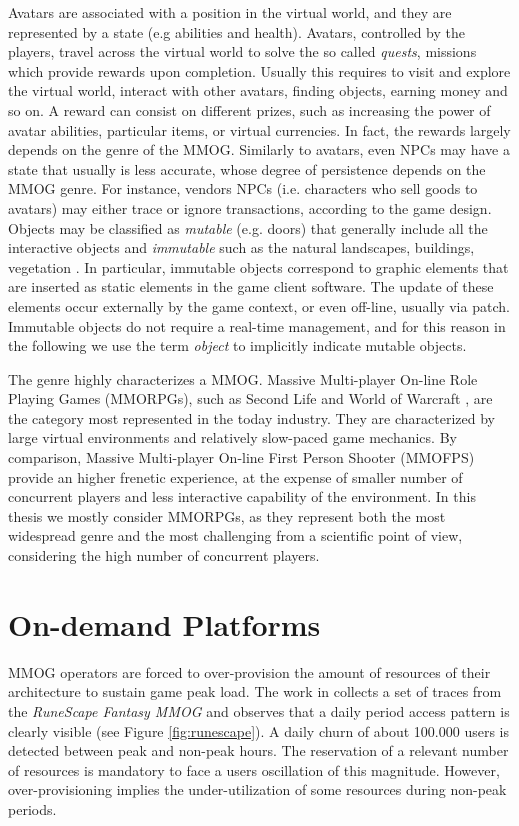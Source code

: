 \documentclass[final,10pt,a5paper]{phdimt}
\theoremstyle{definition}
\begin{document}
Avatars are associated with a position in the virtual world, and they are represented by a state (e.g  abilities and health).
Avatars, controlled by the players, travel across the virtual world to solve the so called \textit{quests}, missions which provide rewards upon completion.
Usually this requires to visit and explore the virtual world, interact with other avatars, finding objects, earning money and so on. 
A reward can consist on different prizes, such as increasing the power of avatar abilities, particular items, or virtual currencies. In fact, the rewards largely depends on the genre of the MMOG. 
Similarly to avatars, even NPCs may have a state that usually is less accurate, whose degree of persistence depends on the MMOG genre. 
For instance, vendors NPCs (i.e. characters who sell goods to avatars) may either trace or ignore transactions, according to the game design.
Objects may be classified as \textit{mutable} (e.g. doors) that generally include all the interactive objects and \textit{immutable} such as the natural landscapes, buildings, vegetation \cite{Bharambea}.
In particular, immutable objects correspond to graphic elements that are inserted as static elements in the game client software. The update of these elements occur externally by the game context, or even off-line, usually via patch.
Immutable objects do not require a real-time management, and for this reason in the following we use the term \textit{object} to implicitly indicate mutable objects.


The genre highly characterizes a MMOG.
Massive Multi-player On-line Role Playing Games (MMORPGs), such as Second Life \cite{sl-site} and World of Warcraft \cite{wow-site}, are the category most represented in the today industry. They are characterized by large virtual environments and relatively slow-paced game mechanics. By comparison, Massive Multi-player On-line First Person Shooter (MMOFPS) provide an higher frenetic experience, at the expense of smaller number of concurrent players and less interactive capability of the environment.
In this thesis we mostly consider MMORPGs, as they represent both the most widespread genre and the most challenging from a scientific point of view, considering the high number of concurrent players.




\section{On-demand Platforms}

MMOG operators are forced to over-provision the amount of resources of their architecture to sustain game peak load. 
The work in \cite{Marzolla} collects a set of traces from the {\em RuneScape Fantasy MMOG} and observes that a daily period access pattern is clearly visible (see Figure \ref{fig:runescape}). A daily churn of about 100.000 users is detected between peak and non-peak hours. 
The reservation of a relevant number of resources is mandatory to face a users oscillation of this magnitude.
However, over-provisioning implies the under-utilization of some resources during non-peak periods.
\end{document}

